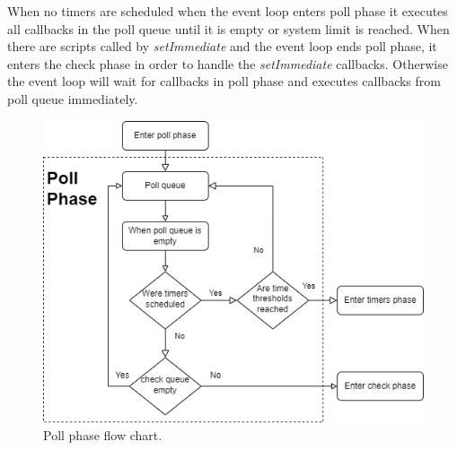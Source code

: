 When no timers are scheduled when the event loop enters poll phase it executes all callbacks in the poll queue until it is empty or system limit is reached.
When there are scripts called by \textit{setImmediate} and the event loop ends poll phase, it enters the check phase in order to handle the \textit{setImmediate} callbacks.
Otherwise the event loop will wait for callbacks in poll phase and executes callbacks from poll queue immediately.
\begin{figure}[htbp]
    \includegraphics[scale=0.8]{images/poll_phase_flow_chart.png}
    \caption{Poll phase flow chart.}
    \label{figure:nodejs:pollPhase}
\end{figure}